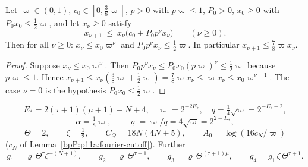 \begin{lemma}\label{bpP:p11a:geom-recursion}
Let $\varpi\in(0,1)$, $c_0\in[0,\frac38\varpi]$, $p>0$ with $p\varpi\le1$, $P_0>0$, $x_0\ge0$ with $P_0x_0\le\frac12\varpi$, and let $x_\nu\ge0$ satisfy
\[x_{\nu+1}\ \le\ x_\nu\bigl(c_0+P_0p^{\nu}x_\nu\bigr)\qquad(\nu\ge0).\]
Then for all $\nu\ge0$: $x_\nu\le x_0\varpi^\nu$ and $P_0p^\nu x_\nu\le\frac12\varpi$. In particular $x_{\nu+1}\le\frac78\varpi x_\nu$.
\end{lemma}
\begin{proof}
\label{stepP:p11a:gr-ind} Suppose $x_\nu\le x_0\varpi^\nu$. Then $P_0p^\nu x_\nu\le P_0x_0(p\varpi)^\nu\le\frac12\varpi$ because $p\varpi\le1$. Hence $x_{\nu+1}\le x_\nu(\frac38\varpi+\frac12\varpi)=\frac78\varpi x_\nu\le\varpi x_\nu\le x_0\varpi^{\nu+1}$. The case $\nu=0$ is the hypothesis $P_0x_0\le\frac12\varpi$.
\end{proof}

\begin{definition}\label{bpP:p11a:schedule-consts}
\[E_*=2(\tau+1)(\mu+1)+N+4,\quad \varpi=2^{-2E_*},\quad q=\tfrac14\sqrt\varpi=2^{-E_*-2},\]
\[\alpha=\tfrac18\varpi,\qquad \varrho=\varpi/q=4\sqrt\varpi=2^{2-E_*},\]
\[\Theta=2,\qquad\zeta=\tfrac12,\qquad C_Q=18N(4N+5),\qquad A_0=\log(16c_N/\varpi)\]
($c_N$ of Lemma~\ref{bpP:p11a:fourier-cutoff}). Further
\[g_1=\varrho\,\Theta^{\tau}\zeta^{-(N+1)},\qquad g_2=\varrho\,\Theta^{\tau+1},\qquad g_3=\varrho\,\Theta^{(\tau+1)\mu},\qquad g_4=g_1\,\zeta\,\Theta^{\tau+1}.\]
\end{definition}

